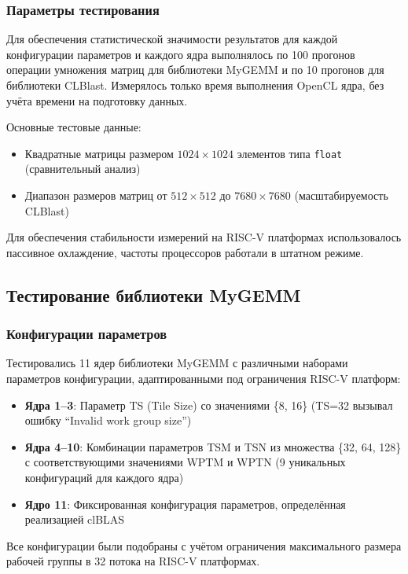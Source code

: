 \subsubsection{Параметры тестирования}

Для обеспечения статистической значимости результатов для каждой конфигурации параметров и каждого ядра выполнялось по 100 прогонов операции умножения матриц для библиотеки MyGEMM и по 10 прогонов для библиотеки CLBlast. Измерялось только время выполнения OpenCL ядра, без учёта времени на подготовку данных.

Основные тестовые данные:
\begin{itemize}
    \item Квадратные матрицы размером $1024 \times 1024$ элементов типа \texttt{float} (сравнительный анализ)
    \item Диапазон размеров матриц от $512 \times 512$ до $7680 \times 7680$ (масштабируемость CLBlast)
\end{itemize}

Для обеспечения стабильности измерений на RISC-V платформах использовалось пассивное охлаждение, частоты процессоров работали в штатном режиме.

\subsection{Тестирование библиотеки MyGEMM}

\subsubsection{Конфигурации параметров}

Тестировались 11 ядер библиотеки MyGEMM с различными наборами параметров конфигурации, адаптированными под ограничения RISC-V платформ:

\begin{itemize}
    \item \textbf{Ядра 1--3}: Параметр TS (Tile Size) со значениями \{8, 16\} (TS=32 вызывал ошибку ``Invalid work group size'')
    \item \textbf{Ядра 4--10}: Комбинации параметров TSM и TSN из множества \{32, 64, 128\} с соответствующими значениями WPTM и WPTN (9 уникальных конфигураций для каждого ядра)
    \item \textbf{Ядро 11}: Фиксированная конфигурация параметров, определённая реализацией clBLAS
\end{itemize}

Все конфигурации были подобраны с учётом ограничения максимального размера рабочей группы в 32 потока на RISC-V платформах.

